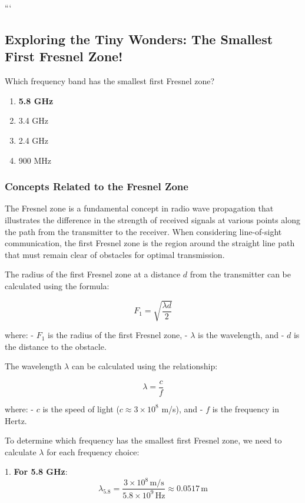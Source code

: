 ```
\subsection{Exploring the Tiny Wonders: The Smallest First Fresnel Zone!}

\begin{tcolorbox}[colback=blue!5!white, colframe=blue!75!black, title={Question ID: E9A08}]
    Which frequency band has the smallest first Fresnel zone?
    \begin{enumerate}[label=\Alph*.]
        \item \textbf{5.8 GHz}
        \item 3.4 GHz
        \item 2.4 GHz
        \item 900 MHz
    \end{enumerate}
\end{tcolorbox}

\subsubsection{Concepts Related to the Fresnel Zone}

The Fresnel zone is a fundamental concept in radio wave propagation that illustrates the difference in the strength of received signals at various points along the path from the transmitter to the receiver. When considering line-of-sight communication, the first Fresnel zone is the region around the straight line path that must remain clear of obstacles for optimal transmission.

The radius of the first Fresnel zone at a distance \(d\) from the transmitter can be calculated using the formula:

\[
F_1 = \sqrt{\frac{\lambda d}{2}}
\]

where:
- \(F_1\) is the radius of the first Fresnel zone,
- \(\lambda\) is the wavelength, and
- \(d\) is the distance to the obstacle.

The wavelength \(\lambda\) can be calculated using the relationship:

\[
\lambda = \frac{c}{f}
\]

where:
- \(c\) is the speed of light (\(c \approx 3 \times 10^8\) m/s), and
- \(f\) is the frequency in Hertz.

To determine which frequency has the smallest first Fresnel zone, we need to calculate \(\lambda\) for each frequency choice:

1. \textbf{For 5.8 GHz}:
   \[
   \lambda_{5.8} = \frac{3 \times 10^8 \, \text{m/s}}{5.8 \times 10^9 \, \text{Hz}} \approx 0.0517 \, \text{m}
   \]

